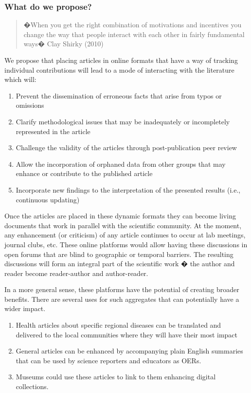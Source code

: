 \documentclass[final,authoryear,3p]{elsarticle-open-drafting}
\begin{document}
\subsubsection{What do we propose?}

\begin{quote}
�When you get the right combination of motivations and incentives you change the way that people interact with each other in fairly fundamental ways� Clay Shirky (2010)
\end{quote}

We propose that placing articles in online formats that have a way of tracking individual contributions will lead to a mode of interacting with the literature which will:

\begin{enumerate}
	\item Prevent the dissemination of erroneous facts that arise from typos or omissions
	\item Clarify methodological issues that may be inadequately or incompletely represented in the article
	\item Challenge the validity of the articles through post-publication peer review
	\item Allow the incorporation of orphaned data from other groups that may enhance or contribute to the published article
	\item Incorporate new findings to the interpretation of the presented results (i.e., continuous updating)
\end{enumerate}

Once the articles are placed in these dynamic formats they can become living documents that work in parallel with the scientific community. At the moment, any enhancement (or criticism) of any article continues to occur at lab meetings, journal clubs, etc. These online platforms would allow having these discussions in open forums that are blind to geographic or temporal barriers. The resulting discussions will form an integral part of the scientific work � the author and reader become reader-author and author-reader.

In a more general sense, these platforms have the potential of creating broader benefits. There are several uses for such aggregates that can potentially have a wider impact. 

\begin{enumerate}
\item Health articles about specific regional diseases can be translated and delivered to the local communities where they will have their most impact
\item General articles can be enhanced by accompanying plain English summaries that can be used by science reporters and educators as OERs. 
\item Museums could use these articles to link to them enhancing digital collections. 
\end{enumerate}
\end{document}
